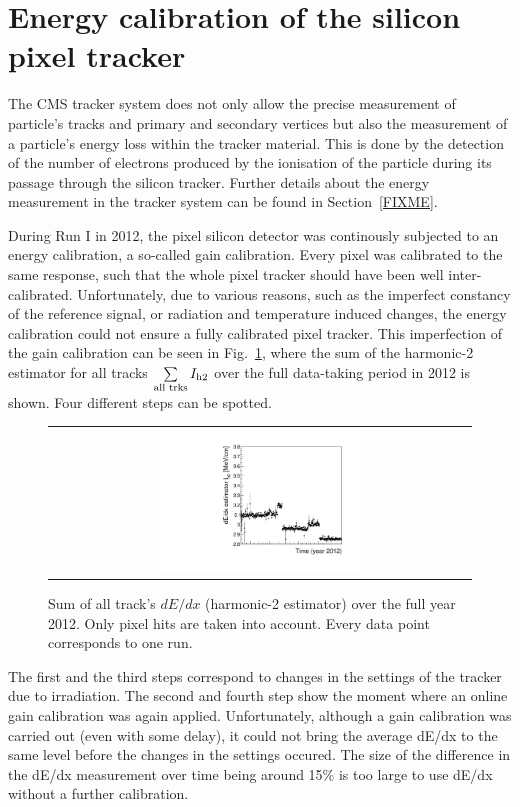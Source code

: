 \section{Energy calibration of the silicon pixel tracker}

The CMS tracker system does not only allow the precise measurement of particle's tracks and primary and secondary vertices but also the measurement of a particle's energy loss within the tracker material.
This is done by the detection of the number of electrons produced by the ionisation of the particle during its passage through the silicon tracker.
Further details about the energy measurement in the tracker system can be found in Section~\ref{FIXME}.

During Run I in 2012, the pixel silicon detector was continously subjected to an energy calibration, a so-called gain calibration.
Every pixel was calibrated to the same response, such that the whole pixel tracker should have been well inter-calibrated.
Unfortunately, due to various reasons, such as the imperfect constancy of the reference signal, or radiation and temperature induced changes, the energy calibration could not ensure a fully calibrated pixel tracker.
This imperfection of the gain calibration can be seen in Fig.~\ref{fig:StabilityPlot_beforeCalibration}, where the sum of the harmonic-2 estimator for all tracks $\sum\limits_{\text{all trks}}I_{\text{h2}}$ over the full data-taking period in 2012 is shown.
Four different steps can be spotted.
\begin{figure}[!b]
  \centering 
  \begin{tabular}{c}
  \includegraphics[width=0.49\textwidth]{figures/analysis/StabilityPlot_Pixel_beforeCalibration_withoutStepFits_NEW.pdf}
  \end{tabular}
  \caption{Sum of all track's $dE/dx$ (harmonic-2 estimator) over the full year 2012. Only pixel hits are taken into account. Every data point corresponds to one run.} 
  \label{fig:StabilityPlot_beforeCalibration}
\end{figure}
The first and the third steps correspond to changes in the settings of the tracker due to irradiation.
The second and fourth step show the moment where an online gain calibration was again applied.
Unfortunately, although a gain calibration was carried out (even with some delay), it could not bring the average dE/dx to the same level before the changes in the settings occured.
The size of the difference in the dE/dx measurement over time being around 15\% is too large to use dE/dx without a further calibration.

